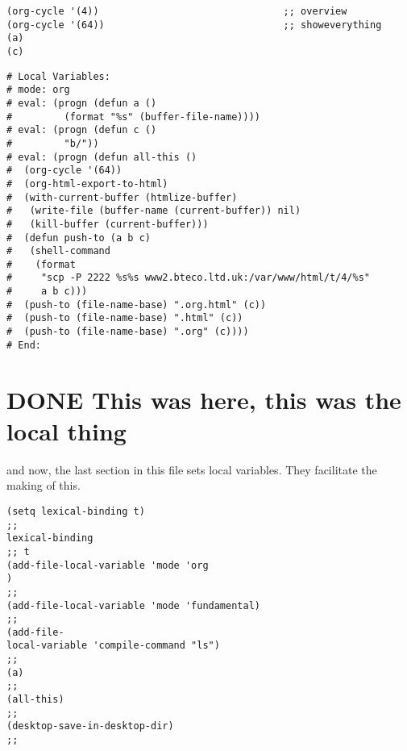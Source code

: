 \documentclass[11pt]{article}
\begin{document}
\begin{verbatim}
(org-cycle '(4))                                ;; overview
(org-cycle '(64))                               ;; showeverything
(a)
(c)
\end{verbatim}

\begin{verbatim}
# Local Variables:
# mode: org
# eval: (progn (defun a ()
#         (format "%s" (buffer-file-name))))
# eval: (progn (defun c ()
#         "b/"))
# eval: (progn (defun all-this ()
#  (org-cycle '(64))
#  (org-html-export-to-html)
#  (with-current-buffer (htmlize-buffer) 
#   (write-file (buffer-name (current-buffer)) nil)
#   (kill-buffer (current-buffer)))
#  (defun push-to (a b c)
#   (shell-command
#    (format
#     "scp -P 2222 %s%s www2.bteco.ltd.uk:/var/www/html/t/4/%s"
#     a b c)))
#  (push-to (file-name-base) ".org.html" (c))
#  (push-to (file-name-base) ".html" (c))
#  (push-to (file-name-base) ".org" (c))))
# End:
\end{verbatim}
\section*{{\bfseries\sffamily DONE} This was here, this was the local thing}
\label{sec:org2ecd637}
and now, the last section in this file sets local variables. They facilitate
the making of this.
\begin{verbatim}
(setq lexical-binding t)
;; 
lexical-binding
;; t
(add-file-local-variable 'mode 'org
)
;;
(add-file-local-variable 'mode 'fundamental)
;;
(add-file-
local-variable 'compile-command "ls")
;; 
(a)
;;
(all-this)
;;   
(desktop-save-in-desktop-dir)
;; 
\end{verbatim}


\end{document}
